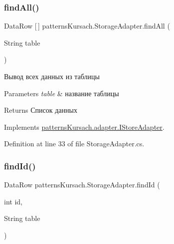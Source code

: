 \mbox{\label{classpatterns_kursach_1_1_storage_adapter_a08e1b401021fac85dfd2f22a8654171a}} 
\subsubsection{\texorpdfstring{find\+All()}{findAll()}}
{\footnotesize\ttfamily Data\+Row \mbox{[}$\,$\mbox{]} patterns\+Kursach.\+Storage\+Adapter.\+find\+All (\begin{DoxyParamCaption}\item[{String}]{table }\end{DoxyParamCaption})}



Вывод всех данных из таблицы 


\begin{DoxyParams}{Parameters}
{\em table} & название таблицы\\
\hline
\end{DoxyParams}
\begin{DoxyReturn}{Returns}
Список данных
\end{DoxyReturn}


Implements \mbox{\hyperlink{interfacepatterns_kursach_1_1adapter_1_1_i_store_adapter_a13f0beab6001c24e72b16d3afa1c5f7a}{patterns\+Kursach.\+adapter.\+I\+Store\+Adapter}}.



Definition at line 33 of file Storage\+Adapter.\+cs.

\mbox{\label{classpatterns_kursach_1_1_storage_adapter_a6b1e7c2a228f04ef4708702a8e11f114}} 
\subsubsection{\texorpdfstring{find\+Id()}{findId()}}
{\footnotesize\ttfamily Data\+Row patterns\+Kursach.\+Storage\+Adapter.\+find\+Id (\begin{DoxyParamCaption}\item[{int}]{id,  }\item[{String}]{table }\end{DoxyParamCaption})}



